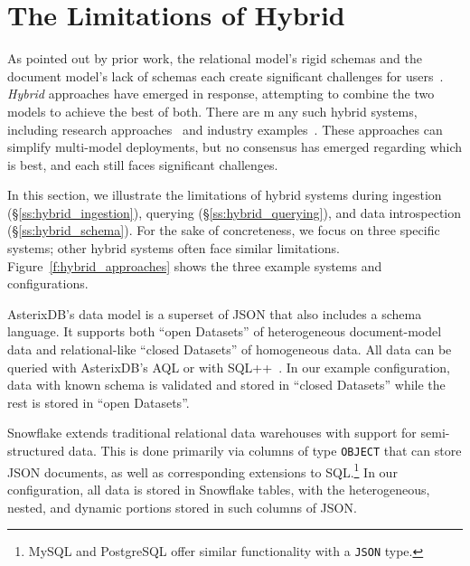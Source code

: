 
\section{The Limitations of Hybrid} \label{s:hybrid}

As pointed out by prior work, the relational model's rigid schemas and the document model's lack of schemas each create significant challenges for users~\cite{snowflake, lorel, asterixdb, what_goes_around}. {\em Hybrid} approaches have emerged in response, attempting to combine the two models to achieve the best of both. There are m any such hybrid systems, including research approaches~\cite{asterixdb, sql++, bigdawg, dbms+} and industry examples~\cite{postgres, snowflake, lakehouse, delta_lake, partiql}. These approaches can simplify multi-model deployments, but no consensus has emerged regarding which is best, and each still faces significant challenges.

In this section, we illustrate the limitations of hybrid systems during ingestion (\S\ref{ss:hybrid_ingestion}), querying (\S\ref{ss:hybrid_querying}), and data introspection (\S\ref{ss:hybrid_schema}). For the sake of concreteness, we focus on three specific systems; other hybrid systems often face similar limitations.
Figure~\ref{f:hybrid_approaches} shows the three example systems and configurations.

 AsterixDB's data model is a superset of JSON that also includes a schema language. It supports both ``open Datasets'' of heterogeneous document-model data and relational-like ``closed Datasets'' of homogeneous data. All data can be queried with AsterixDB's AQL or with SQL++~\cite{sql++}. In our example configuration, data with known schema is validated and stored in ``closed Datasets'' while the rest is stored in ``open Datasets''.

 Snowflake extends traditional relational data warehouses with support for semi-structured data. This is done primarily via columns of type \texttt{OBJECT} that can store JSON documents, as well as corresponding extensions to SQL.\footnote{MySQL and PostgreSQL offer similar functionality with a \texttt{JSON} type.} In our configuration, all data is stored in Snowflake tables, with the heterogeneous, nested, and dynamic portions stored in such columns of JSON.

